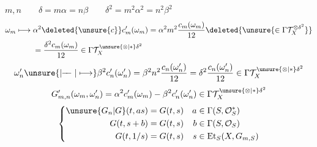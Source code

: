 \qquad $m,n\qquad
\delta=m\alpha=n\beta\qquad\delta^2=m^2\alpha^2=n^2\beta^2$
\[
\begin{aligned}
\omega_m\longmapsto{}&\alpha^2\deleted{\unsure{c}}c'_m(\omega_m)
=\alpha^2m^2\frac{c_m(\omega_m)}{12}
\deleted{\unsure{\in\Gamma\mathcal T_X^{\otimes\delta^2}}}\\
&=\frac{\delta^2c_m(\omega_m)}{12}
\in\Gamma\mathcal T_X^{\unsure{\otimes|*}\delta^2}
\end{aligned}
\]
\[
\omega'_n\unsure{\mathrel{\mid\!\!-\!\!-}|\longmapsto}
\beta^2c'_n(\omega'_n)
=\beta^2n^2\frac{c_n(\omega'_n)}{12}
=\delta^2\frac{c_n(\omega'_n)}{12}
\in\Gamma\mathcal T_X^{\unsure{\otimes|*}\delta^2}
\]
\[
G'_{m,n}(\omega_m,\omega'_n)=\alpha^2c'_m(\omega_m)-\beta^2c'_n(\omega'_n)
\in\Gamma\mathcal T_X^{\unsure{\otimes|*}\delta^2}
\]
\[
\left\{\begin{aligned}
\unsure{G_n|G}(t,as)&=G(t,s)&a&\in\Gamma(S,\mathcal O_S^*)\\
G(t,s+b)&=G(t,s)&b&\in\Gamma(S,\mathcal O_S)\\
G(t,1/s)&=G(t,s)&s&\in\operatorname{Et}_S(X,G_{m,S})
\end{aligned}\right.
\]

\margin{\[
\begin{gathered}
f\longmapsto af+b\qquad df=dg\Longrightarrow G(f,g)=0\\
f\longmapsto af\qquad
\left(\frac{df}{f}\right)^2=\left(\frac{dg}{g}\right)^2
\Longrightarrow G(f,g)=0\\
df\qquad\left(\frac{df}{f}\right)^2\qquad
(df-dg)\left(\left(\frac{df}{f}\right)^2-
\left(\frac{dg}{g}\right)^2\right)\\
\frac{df}{f}=c\frac{dg}{g}\qquad ?\\
\log f=c\log g\\
f=g^c
\end{gathered}
\]}

